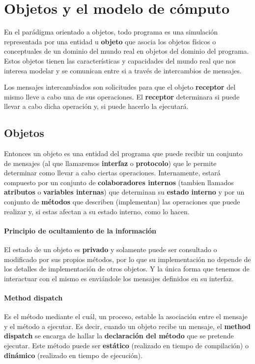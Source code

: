 \section{Objetos y el modelo de cómputo}

En el parádigma orientado a objetos, todo programa es una simulación representada por una entidad u \textbf{objeto} que asocia los objetos físicos o conceptuales de un dominio del mundo real en objetos del dominio del programa. Estos objetos tienen las características y capacidades del mundo real que nos interesa modelar y se comunican entre si a través de intercambios de mensajes.

Los mensajes intercambiados son solicitudes para que el objeto \textbf{receptor} del mismo lleve a cabo una de sus operaciones. El \textbf{receptor} determinara si puede llevar a cabo dicha operación y, si puede hacerlo la ejecutará.

\subsection{Objetos}
Entonces un objeto es una entidad del programa que puede recibir un conjunto de mensajes (al que llamaremos \textbf{interfaz} o \textbf{protocolo}) que le permite determinar como llevar a cabo ciertas operaciones. Internamente, estará compuesto por un conjunto de \textbf{colaboradores internos} (tambien llamados \textbf{atributos} o \textbf{variables internas}) que determinan su \textbf{estado interno} y por un conjunto de \textbf{métodos} que describen (implementan) las operaciones que puede realizar y, si estas afectan a su estado interno, como lo hacen.

\paragraph{Principio de ocultamiento de la información}
El estado de un objeto es \textbf{privado} y solamente puede ser consultado o modificado por sus propios métodos, por lo que su implementación no depende de los detalles de implementación de otros objetos. Y la única forma que tenemos de interactuar con el mismo es enviándole los mensajes definidos en su interfaz.

\paragraph{Method dispatch} Es el método mediante el cuál, un proceso, estable la asociación entre el mensaje y el método a ejecutar. Es decir, cuando un objeto recibe un mensaje, el \textbf{method dispatch} se encarga de hallar la \textbf{declaración del método} que se pretende ejecutar. Este método puede ser \textbf{estático} (realizado en tiempo de compilación) o \textbf{dinámico} (realizado en tiempo de ejecución).

